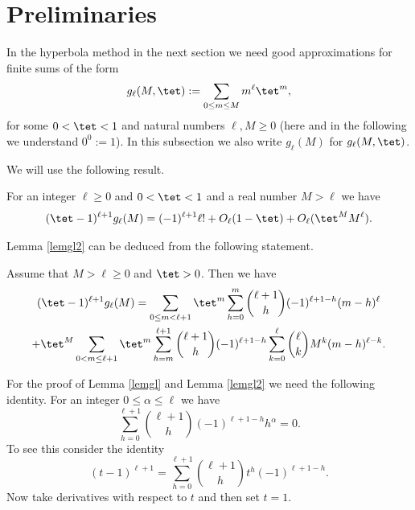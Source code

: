 \section{Preliminaries}
\label{sec:preliminaries}

In the hyperbola method in the next section we need good approximations for finite sums of the form
\[
g_\ell (M,\tet):=\sum_{0\leq m\leq M} m^\ell \tet^m,
\]
for some $0<\tet <1$ and natural numbers $\ell,M\geq 0$ (here and in the following we understand $0^0:=1$).
In this subsection we also write $g_\ell(M)$ for $g_\ell(M,\tet)$.

We will use the following result.

\begin{lemma}\label{lemgl2}
For an integer $\ell\geq 0$ and $0<\tet < 1$ and a real number $M>\ell$ we have
\[
(\tet -1)^{\ell+1}g_\ell(M)=(-1)^{\ell+1} \ell! +O_\ell(1-\tet)+O_\ell (\tet^M M^\ell).
\]
\end{lemma}

Lemma \ref{lemgl2} can be deduced from the following statement.

\begin{lemma}\label{lemgl}
Assume that $M>\ell\geq 0$ and $\tet >0$. Then we have
\begin{multline*}
(\tet -1)^{\ell+1}g_\ell(M)= \sum_{0\leq m<\ell+1}\tet^m \sum_{h=0}^m \binom{\ell+1}{h}(-1)^{\ell+1-h}(m-h)^\ell \\
+ \tet^M \sum_{0<m\leq \ell+1}\tet^m \sum_{h=m}^{\ell+1}\binom{\ell+1}{h}(-1)^{\ell+1-h}\sum_{k=0}^\ell \binom{\ell}{k} M^k (m-h)^{\ell-k}.
\end{multline*}
\end{lemma}

For the proof of Lemma \ref{lemgl} and Lemma \ref{lemgl2} we need the following identity. For an integer $0\leq \alpha\leq \ell$ we have
\begin{equation}\label{eqnbinom}
\sum_{h=0}^{\ell+1}\binom{\ell+1}{h} (-1)^{\ell+1-h}h^\alpha =0.
\end{equation}
To see this consider the identity
\[
(t-1)^{\ell+1}=\sum_{h=0}^{\ell+1}\binom{\ell+1}{h} t^h (-1)^{\ell+1-h}.
\]
Now take derivatives with respect to $t$ and then set $t=1$.\par


